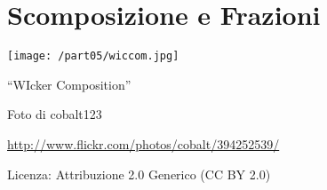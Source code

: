 \part{Scomposizione e Frazioni}
\texttt{[image: /part05/wiccom.jpg]}
  \begin{center}
    {\large ``WIcker Composition''}\par
    Foto di cobalt123\par
    \url{http://www.flickr.com/photos/cobalt/394252539/}\par
    Licenza: Attribuzione 2.0 Generico (CC BY 2.0)\par
  \end{center}
\clearpage
\cleardoublepage